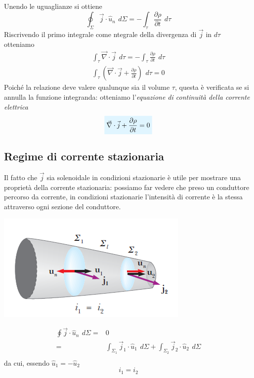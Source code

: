 \documentclass[x11names]{report}
\begin{document}
Unendo le uguaglianze si ottiene
\[
\oint_{\Sigma} \vec{j}\cdot \hat{u}_n \,\ d\Sigma = -\int_\tau \frac{\partial\rho}{\partial t} \,\ d\tau
\]
Riscrivendo il primo integrale come ntegrale della divergenza di \(\vec{j}\) in \(d\tau\) otteniamo
\begin{gather}
	\int_\tau \vec{\nabla} \cdot \vec{j} \,\ d\tau = - \int_\tau \frac{\partial\rho}{\partial t} \,\ d\tau \\
	\int_\tau \left(\vec{\nabla} \cdot \vec{j} + \frac{\partial\rho}{\partial t}\right)\,\ d\tau = 0
\end{gather}
Poiché la relazione deve valere qualunque sia il volume \(\tau\), questa è verificata se si annulla la funzione integranda: otteniamo l'\textit{equazione di continuità della corrente elettrica}
\begin{equation}
	\label{cont corr}
	\viola{\vec{\nabla} \cdot \vec{j} + \frac{\partial\rho}{\partial t} = 0}
\end{equation}
\subsection{Regime di corrente stazionaria}
Il fatto che \(\vec{j}\) sia solenoidale in condizioni stazionarie è utile per mostrare una proprietà della corrente stazionaria: possiamo far vedere che preso un conduttore percorso da corrente, in condizioni stazionarie l'intensità di corrente è la stessa attraverso ogni sezione del conduttore.
\begin{center}
	\includegraphics[scale=0.5]{img/regime_corrente.png}
\end{center}
\begin{align*}
	\oint \vec{j}\cdot \hat{u}_n \,\ d\Sigma =& 0 \\
	=& \int_{\Sigma_1}\vec{j}_1\cdot \hat{u}_1 \,\ d\Sigma + \int_{\Sigma_2}\vec{j}_2\cdot \hat{u}_2 \,\ d\Sigma \\
\end{align*}
da cui, essendo \(\hat{u}_1 = - \hat{u}_2\)
\[
i_1 = i_2
\]
\end{document}
